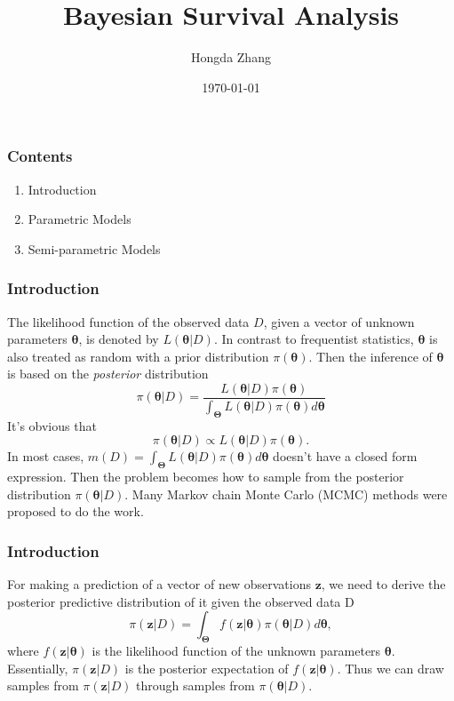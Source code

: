\documentclass{beamer}
\title[]{Bayesian Survival Analysis}
\author[Hongda Zhang]{Hongda Zhang}
\institute{Nanjing University}
\date{\today}
\begin{document}
	\begin{frame}
		\titlepage
	\end{frame}
	
	\begin{frame}
		\frametitle{Contents}
		\begin{enumerate}
			\item Introduction
			\item Parametric Models
			\item Semi-parametric Models
		\end{enumerate}
		\nocite{*}
	\end{frame}
	
	\begin{frame}
		\frametitle{Introduction}
		The likelihood function of the observed data $D$, given a vector of unknown parameters $\boldsymbol{\theta}$, is denoted by $L(\boldsymbol{\theta}|D)$. In contrast to frequentist statistics, $\boldsymbol{\theta}$ is also treated as random with a prior distribution $\pi(\boldsymbol{\theta})$. Then the inference of $\boldsymbol{\theta}$ is based on the \emph{posterior} distribution 
		\[
		\pi(\boldsymbol{\theta} | D) = \frac{L(\boldsymbol{\theta} | D)\pi(\boldsymbol{\theta})}{\int_{\boldsymbol{\Theta}}L(\boldsymbol{\theta} | D)\pi(\boldsymbol{\theta}) d\boldsymbol{\theta}}
		\]
		It's obvious that 
		\[
		\pi(\boldsymbol{\theta} | D) \propto L(\boldsymbol{\theta} | D)\pi(\boldsymbol{\theta}).
		\]
		In most cases, $m(D) = \int_{\boldsymbol{\Theta}}L(\boldsymbol{\theta} | D)\pi(\boldsymbol{\theta}) d\boldsymbol{\theta}$ doesn't have a closed form expression. Then the problem becomes how to sample from the posterior distribution $\pi(\boldsymbol{\theta} | D)$. Many Markov chain Monte Carlo (MCMC) methods were proposed to do the work.
	\end{frame}
	
	\begin{frame}
		\frametitle{Introduction}
		For making a prediction of a vector of new observations $\boldsymbol{z}$, we need to derive the posterior predictive distribution of it given the observed data D
		\[
		\pi(\boldsymbol{z} | D) = \int_{\boldsymbol{\Theta}}f(\boldsymbol{z} | \boldsymbol{\theta}) \pi(\boldsymbol{\theta} | D) d\boldsymbol{\theta},
		\] 
		where $f(\boldsymbol{z} | \boldsymbol{\theta})$ is the likelihood function of the unknown parameters $\boldsymbol{\theta}$. Essentially, $\pi(\boldsymbol{z} | D)$ is the posterior expectation of $f(\boldsymbol{z} | \boldsymbol{\theta})$. Thus we can draw samples from $\pi(\boldsymbol{z} | D)$ through samples from $ \pi(\boldsymbol{\theta} | D)$.
	\end{frame}
	
\end{document}
